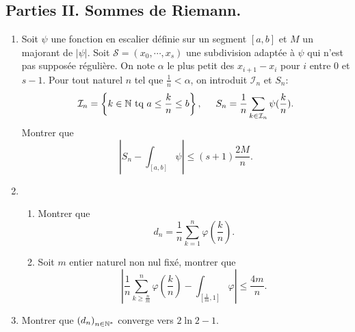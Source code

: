 \subsection*{Parties II. Sommes de Riemann.}
\begin{enumerate}
 \item Soit $\psi$ une fonction en escalier définie sur un segment $[a,b]$ et $M$ un majorant de $|\psi|$. Soit $\mathcal S =(x_0,\cdots,x_s)$ une subdivision adaptée à $\psi$ qui n'est pas supposée régulière. On note $\alpha$ le plus petit des $x_{i+1}-x_i$ pour $i$ entre $0$ et $s-1$.\newline
Pour tout naturel $n$ tel que $\frac{1}{n}<\alpha$, on introduit $\mathcal I_n$ et $S_n$:
\begin{displaymath}
  \mathcal I_n = \left\lbrace k\in \mathbb{N} \text{ tq } a\leq \frac{k}{n}\leq b\right\rbrace, \hspace{0.5cm}
  S_n =\frac{1}{n}\sum_{k\in \mathcal I_n}\psi(\frac{k}{n}) .
\end{displaymath}
 Montrer que
\begin{displaymath}
 \left\vert S_n - \int_{[a,b]}\psi\right\vert \leq (s + 1)\frac{2M}{n}.
\end{displaymath}

\item 
\begin{enumerate}
\item Montrer que
\begin{displaymath}
 d_n = \frac{1}{n}\sum_{k=1}^n\varphi(\frac{k}{n}) .
\end{displaymath}
\item Soit $m$ entier naturel non nul fixé, montrer que
\begin{displaymath}
\left \vert \frac{1}{n}\sum_{k\geq\frac{n}{m}}^n\varphi(\frac{k}{n})
-\int_{[\frac{1}{m},1]}\varphi
\right\vert \leq \frac{4m}{n} .
\end{displaymath}
\end{enumerate}
\item Montrer que $\left( d_n\right) _{n\in \mathbb{N}^*}$ converge vers $2\ln 2 -1$.
\end{enumerate}


